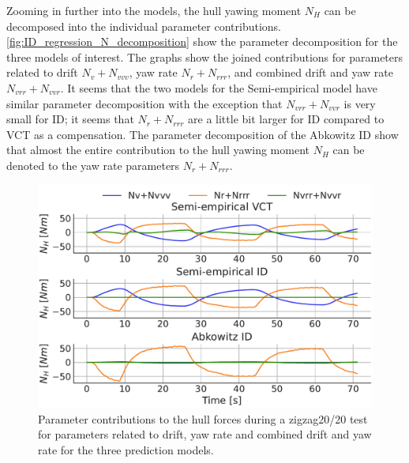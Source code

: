 Zooming in further into the models, the hull yawing moment $N_H$ can be decomposed into the individual parameter contributions. \autoref{fig:ID_regression_N_decomposition} show the parameter decomposition for the three models of interest. The graphs show the joined contributions for parameters related to drift $N_v+N_{vvv}$, yaw rate $N_r+N_{rrr}$, and combined drift and yaw rate $N_{vrr}+N_{vvr}$. It seems that the two models for the Semi-empirical model have similar parameter decomposition with the exception that $N_{vrr}+N_{vvr}$ is very small for ID; it seems that $N_r+N_{rrr}$ are a little bit larger for ID compared to VCT as a compensation.
The parameter decomposition of the Abkowitz ID show that almost the entire contribution to the hull yawing moment $N_H$ can be denoted to the yaw rate parameters $N_r+N_{rrr}$. 
\begin{figure}[h!]
\begin{center}
    \includegraphics[width=\columnwidth]{figures/result_ID_regression.ID_regression_N_decomposition.pdf}
    \caption{Parameter contributions to the hull forces during a zigzag20/20 test for parameters related to drift, yaw rate and combined drift and yaw rate for the three prediction models.}
    \label{fig:ID_regression_N_decomposition}
\end{center}
\end{figure}
